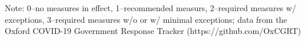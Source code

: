 \begin{table}[bp]
\begin{tabularx}{\linewidth}{p{3.5cm}|rrrr|rrrr|rrrr|CC}
\end{tabularx}

\begin{flushleft}
\footnotesize Note: 0--no measures in effect, 1--recommended measurs, 2--required measures w/ exceptions, 3--required measures w/o or w/ minimal exceptions; data from the Oxford COVID-19 Government Response Tracker (https://github.com/OxCGRT)
\end{flushleft}


\vspace*{\fill}
\end{table}
